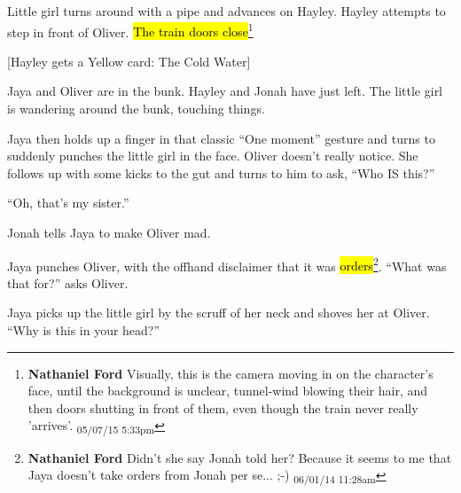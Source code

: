 Little girl turns around with a pipe and advances on Hayley.  Hayley attempts to step in front of Oliver.  \hl{The train doors close}\footnote{\textbf{Nathaniel Ford }Visually, this is the camera moving in on the character's face, until the background is unclear, tunnel-wind blowing their hair, and then doors shutting in front of them, even though the train never really 'arrives'. \textsubscript{05/07/15 5:33pm}}



{[}Hayley gets a Yellow card: The Cold Water{]}






Jaya and Oliver are in the bunk.  Hayley and Jonah have just left.  The little girl is wandering around the bunk, touching things.


Jaya then holds up a  finger in that classic ``One moment'' gesture and turns to suddenly punches the little girl in the face.  Oliver doesn't really notice.  She follows up with some kicks to the gut and turns to him to ask,  ``Who IS this?''

``Oh, that's my sister.''

Jonah tells Jaya to make Oliver mad.

Jaya punches Oliver, with the offhand disclaimer that it was \hl{orders}\footnote{\textbf{Nathaniel Ford }Didn't she say Jonah told her? Because it seems to me that Jaya doesn't take orders from Jonah per se... ;-) \textsubscript{06/01/14 11:28am}}.  ``What was that for?'' asks Oliver.

Jaya picks up the little girl by the scruff of her neck and shoves her at Oliver.  ``Why is this in your head?''

